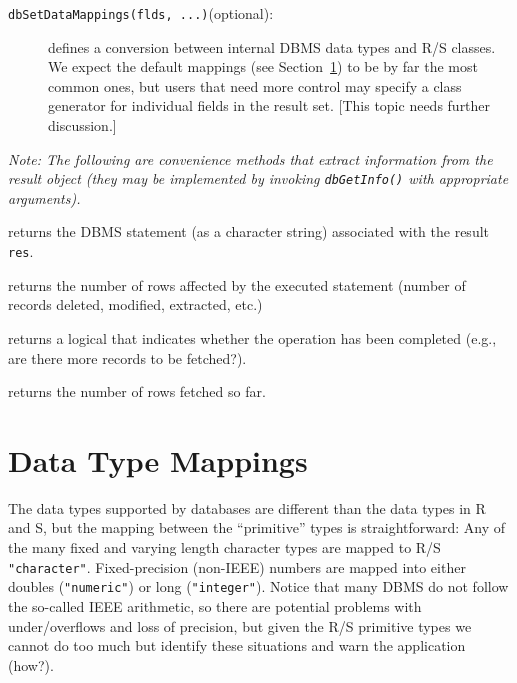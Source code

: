 \documentclass[graphics,times,psfig,dvips,hyper]{article}
\newcommand{\sfun}[1]{\mbox{\tt #1()}}  %
\newcommand{\sobj}[1]{\mbox{\tt #1}}    %
\newcommand{\smethod}[1]{\mbox{\tt #1}} %
\begin{document}
\begin{description}
\item[\smethod{dbSetDataMappings(flds, ...)}(optional):] 
  defines a conversion between internal DBMS data types
  and R/S classes.  We expect the default mappings (see
  Section~\ref{sec:data-mappings}) to be by far the most
  common ones, but users that need more control may specify
  a class generator for individual fields in the result set.
  [This topic needs further discussion.]

\end{description}

\emph{Note: The following are convenience methods that extract
information from the result object (they may be implemented
by invoking \sfun{dbGetInfo} with appropriate arguments).  
}

\begin{description}\label{meth:res-others}
\item[\smethod{dbGetStatement(res, ...)}(optional):]
  returns the DBMS statement (as a character string) associated
  with the result \sobj{res}.

\item[\smethod{dbGetRowsAffected(res, ...)}(optional):]
  returns the number of rows affected by the executed statement
  (number of records deleted, modified, extracted, etc.)

\item[\smethod{dbHasCompleted(res, ...)}(optional):] 
  returns a logical that indicates whether the operation has been
  completed (e.g., are there more records to be fetched?).

\item[\smethod{dbGetRowCount(res, ...)}(optional):]
  returns the number of rows fetched so far.

\end{description}

\section{Data Type Mappings}\label{sec:data-mappings}
The data types supported by databases are different than the
data types in R and S, but the mapping between the ``primitive''
types is straightforward:  Any of the many fixed and varying
length character types are mapped to R/S \sobj{"character"}.
Fixed-precision (non-IEEE) numbers are mapped into either doubles
(\sobj{"numeric"}) or long (\sobj{"integer"}). Notice that many
DBMS do not follow the so-called IEEE arithmetic, so there are
potential problems with under/overflows and loss of precision, but
given the R/S primitive types we cannot do too much but identify
these situations and warn the application (how?).
\end{document}
